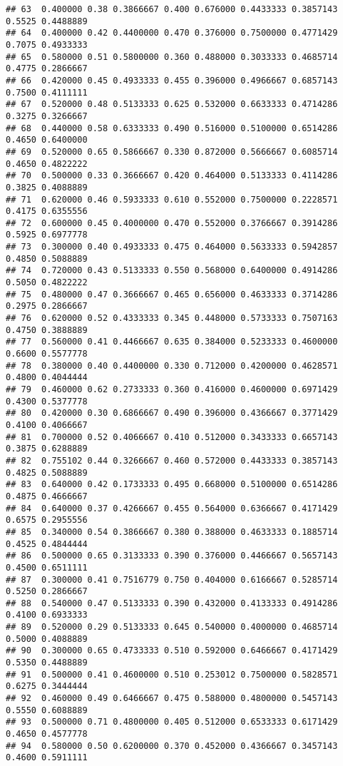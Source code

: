 \documentclass[
]{article}
\begin{document}
\begin{verbatim}
## 63  0.400000 0.38 0.3866667 0.400 0.676000 0.4433333 0.3857143 0.5525 0.4488889
## 64  0.400000 0.42 0.4400000 0.470 0.376000 0.7500000 0.4771429 0.7075 0.4933333
## 65  0.580000 0.51 0.5800000 0.360 0.488000 0.3033333 0.4685714 0.4775 0.2866667
## 66  0.420000 0.45 0.4933333 0.455 0.396000 0.4966667 0.6857143 0.7500 0.4111111
## 67  0.520000 0.48 0.5133333 0.625 0.532000 0.6633333 0.4714286 0.3275 0.3266667
## 68  0.440000 0.58 0.6333333 0.490 0.516000 0.5100000 0.6514286 0.4650 0.6400000
## 69  0.520000 0.65 0.5866667 0.330 0.872000 0.5666667 0.6085714 0.4650 0.4822222
## 70  0.500000 0.33 0.3666667 0.420 0.464000 0.5133333 0.4114286 0.3825 0.4088889
## 71  0.620000 0.46 0.5933333 0.610 0.552000 0.7500000 0.2228571 0.4175 0.6355556
## 72  0.600000 0.45 0.4000000 0.470 0.552000 0.3766667 0.3914286 0.5925 0.6977778
## 73  0.300000 0.40 0.4933333 0.475 0.464000 0.5633333 0.5942857 0.4850 0.5088889
## 74  0.720000 0.43 0.5133333 0.550 0.568000 0.6400000 0.4914286 0.5050 0.4822222
## 75  0.480000 0.47 0.3666667 0.465 0.656000 0.4633333 0.3714286 0.2975 0.2866667
## 76  0.620000 0.52 0.4333333 0.345 0.448000 0.5733333 0.7507163 0.4750 0.3888889
## 77  0.560000 0.41 0.4466667 0.635 0.384000 0.5233333 0.4600000 0.6600 0.5577778
## 78  0.380000 0.40 0.4400000 0.330 0.712000 0.4200000 0.4628571 0.4800 0.4044444
## 79  0.460000 0.62 0.2733333 0.360 0.416000 0.4600000 0.6971429 0.4300 0.5377778
## 80  0.420000 0.30 0.6866667 0.490 0.396000 0.4366667 0.3771429 0.4100 0.4066667
## 81  0.700000 0.52 0.4066667 0.410 0.512000 0.3433333 0.6657143 0.3875 0.6288889
## 82  0.755102 0.44 0.3266667 0.460 0.572000 0.4433333 0.3857143 0.4825 0.5088889
## 83  0.640000 0.42 0.1733333 0.495 0.668000 0.5100000 0.6514286 0.4875 0.4666667
## 84  0.640000 0.37 0.4266667 0.455 0.564000 0.6366667 0.4171429 0.6575 0.2955556
## 85  0.340000 0.54 0.3866667 0.380 0.388000 0.4633333 0.1885714 0.4525 0.4844444
## 86  0.500000 0.65 0.3133333 0.390 0.376000 0.4466667 0.5657143 0.4500 0.6511111
## 87  0.300000 0.41 0.7516779 0.750 0.404000 0.6166667 0.5285714 0.5250 0.2866667
## 88  0.540000 0.47 0.5133333 0.390 0.432000 0.4133333 0.4914286 0.4100 0.6933333
## 89  0.520000 0.29 0.5133333 0.645 0.540000 0.4000000 0.4685714 0.5000 0.4088889
## 90  0.300000 0.65 0.4733333 0.510 0.592000 0.6466667 0.4171429 0.5350 0.4488889
## 91  0.500000 0.41 0.4600000 0.510 0.253012 0.7500000 0.5828571 0.6275 0.3444444
## 92  0.460000 0.49 0.6466667 0.475 0.588000 0.4800000 0.5457143 0.5550 0.6088889
## 93  0.500000 0.71 0.4800000 0.405 0.512000 0.6533333 0.6171429 0.4650 0.4577778
## 94  0.580000 0.50 0.6200000 0.370 0.452000 0.4366667 0.3457143 0.4600 0.5911111

\end{verbatim}
\end{document}
